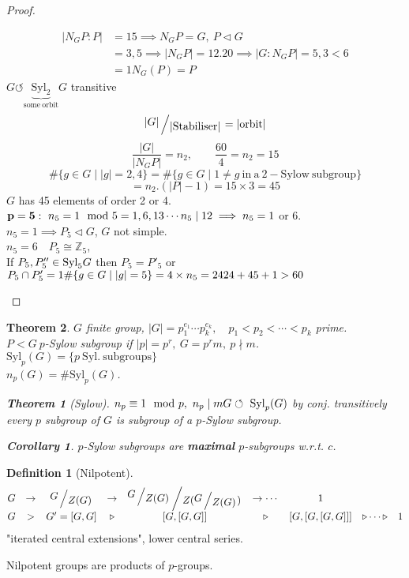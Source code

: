 \documentclass{article}
\let\ddd\cdots
\newcommand{\Z}{\mathbb{Z}}
\newcommand{\quotient}[2]{{\raisebox{.2em}{$#1$}\left/\raisebox{-.2em}{$#2$}\right.}}
\newcommand{\abs}[1]{\left|#1\right|}
\newcommand{\tsubgp}{\triangleleft}
\newcommand{\tsupgp}{\triangleright}
\newtheorem{theorem}{Theorem}[section]
\newtheorem{corollary}{Corollary}[theorem]
\theoremstyle{definition}
\newtheorem{definition}{Definition}[section]
\theoremstyle{remark}
\theoremstyle{example}
\begin{document}
\begin{proof}
\begin{enumerate}
\begin{align*}
				\abs{N_GP:P}&=15 \implies N_GP=G,\ P\tsubgp G\\
				&=3,5 \implies \abs{N_GP}=12.20 \implies \abs{G:N_GP}=5,3 < 6\\
				&=1 N_G(P)=P
			\end{align*}
			$G \circlearrowleft \underbrace{\mathrm{Syl}_2}_\mathrm{some\ orbit}G$ transitive\\
			\[\quotient{\abs{G}}{\abs{\mathrm{Stabiliser}}}=\abs{\mathrm{orbit}}\]
			\[\frac{\abs{G}}{\abs{N_GP}} =n_2,\qquad \frac{60}{4} =n_2 = 15 \]
			\[\#\{g \in G \mid \abs{g}=2,4\} = \#\{g \in G \mid 1 \neq g\ \mathrm{in\ a\ 2-Sylow\ subgroup}\}\]
			\[=n_2.(\abs{P}-1)=15\times 3=45\]
			$G$ has 45 elements of order 2 or 4.
			$\mathbf{p=5}:\ n_5=1\mod 5=1,6,13\ddd\\
			n_5 \mid 12\\
			\implies n_5 = 1$ or $6$.\\
			$n_5 = 1 \implies P_5 \tsubgp G$, $G$ not simple.\\
			$n_5=6\quad P_5 \cong \Z_5$,\\
			If $P_5,P''_5 \in \mathrm{Syl}_5G\\
			$ then $P_5=P'_5$ or $P_5 \cap P'_5=1\\
			\#\{ g \in G \mid \abs{g}=5 \}  = 4 \times n_5 = 24 \\
			24+45+1 > 60$
		\end{enumerate}
	\end{proof}

	\begin{theorem}
		$G$ finite group, $\abs{G}=p_1^{e_1} \ddd p_k^{e_k},\quad p_1<p_2< \ddd < p_k$ prime.\\
		$P < G\ p$-Sylow subgroup if $\abs{p}=p^r,\ G=p^rm,\ p\nmid m$.\\
		$\mathrm{Syl}_p(G)=\{p\ \mathrm{Syl.\ subgroups}\}$\\
		$n_p(G)=\#\mathrm{Syl}_p(G)$.
		\begin{theorem}[Sylow]
			$n_p \equiv 1 \mod p,\ n_p \mid m\\
			G \circlearrowleft\ \mathrm{Syl}_p(G)$ by conj. transitively\\
			every $p$ subgroup of $G$ is subgroup of a $p$-Sylow subgroup.
			\begin{corollary}
				$p$-Sylow subgroups are \textbf{maximal} $p$-subgroups w.r.t. $c$.
			\end{corollary}
		\end{theorem}
	\end{theorem}
	\begin{definition}[Nilpotent]
		\[\begin{matrix}
			G & \to & \quotient{G}{Z(G)} & \to & \quotient{\quotient{G}{Z(G)}}{Z(\quotient{G}{Z(G)})} & \to \ddd & 1\\
			G & > & G'=[G,G] &\tsupgp & [G,[G,G]] & \tsupgp & [G,[G,[G,G]]] & \tsupgp \ddd \tsupgp & 1
		\end{matrix}\]
		"iterated central extensions", lower central series.
	\end{definition}
	Nilpotent groups are products of $p$-groups.
	
\end{document}
